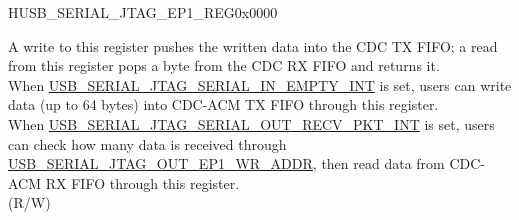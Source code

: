 \begin{register}{H}{USB\_SERIAL\_JTAG\_EP1\_REG}{0x0000}\label{regdesc:USBSERIALJTAGEP1REG}
    \regnewline%
    \begin{regdesc}\begin{reglist}
    \label{fielddesc:USBSERIALJTAGRDWRBYTE}\item [USB\_SERIAL\_JTAG\_RDWR\_BYTE] A write to this register pushes the written data into the CDC TX FIFO; a read from this register pops a byte from the CDC RX FIFO and returns it. \\
    When \hyperref[int:USBSERIALJTAGSERIALINEMPTYINT]{USB\_SERIAL\_JTAG\_SERIAL\_IN\_EMPTY\_INT} is set, users can write data (up to 64 bytes) into CDC-ACM TX FIFO through this register.\\
    When \hyperref[int:USBSERIALJTAGSERIALOUTRECVPKTINT]{USB\_SERIAL\_JTAG\_SERIAL\_OUT\_RECV\_PKT\_INT} is set, users can check how many data is received through \hyperref[fielddesc:USBSERIALJTAGOUTEP1WRADDR]{USB\_SERIAL\_JTAG\_OUT\_EP1\_WR\_ADDR}, then read data from CDC-ACM RX FIFO through this register. \\
    (R/W)
    \end{reglist}\end{regdesc}
    \end{register}


